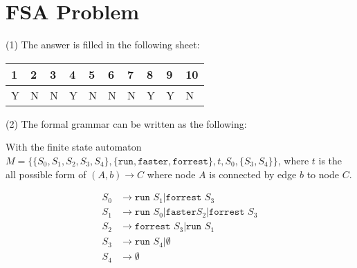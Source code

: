 \documentclass[a4paper, justified]{tufte-handout}
\begin{document}
\section{FSA Problem}

(1) The answer is filled in the following sheet: 
\begin{center}
    \begin{tabular}{|l|l|l|l|l|l|l|l|l|l|}
    \hline
    1 & 2 & 3 & 4 & 5 & 6 & 7 & 8 & 9 & 10 \\ \hline
    Y & N & N & Y & N & N & N & Y & Y & N  \\ \hline
    \end{tabular}
\end{center}

(2) The formal grammar can be written as the following:  

With the finite state automaton $M=\{\{S_0, S_1, S_2, S_3, S_4\}, \{\texttt{run}, \texttt{faster}, \texttt{forrest} \}, t, S_0, \{S_3, S_4\}\}$, where $t$ is the all possible form of $(A, b)\rightarrow C$ where node $A$ is connected by edge $b$ to node $C$. 

\begin{align}
    S_0 & \rightarrow  \texttt{run } S_1 | \texttt{forrest } S_3\\
S_1 & \rightarrow  \texttt{run } S_0 | \texttt{faster} S_2 | \texttt{forrest } S_3\\
S_2 & \rightarrow  \texttt{forrest } S_3 |\texttt{run } S_1 \\
S_3 & \rightarrow  \texttt{run } S_4 | \emptyset \\
S_4 & \rightarrow  \emptyset
\end{align}
\end{document}
